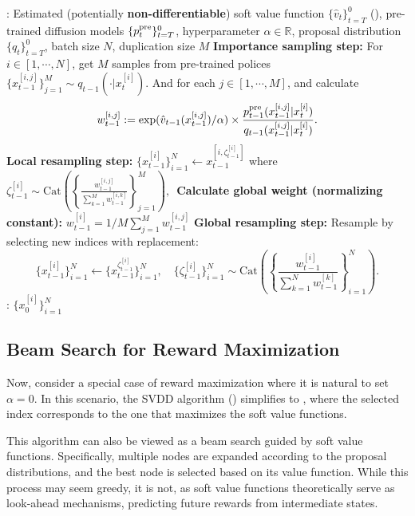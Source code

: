 \begin{algorithm}[!th]
\caption{Nested-IS-Based Guidance}\label{alg:nested_IS}
\begin{algorithmic}[1]
     : Estimated (potentially \textbf{non-differentiable}) soft value function $\{\hat v_t\}_{t=T}^0$ (), pre-trained diffusion models $\{p^{\mathrm{pre}}_t\}_{t=T}^0$, hyperparameter $\alpha \in \mathbb{R}$, proposal distribution $\{q_t\}_{t=T}^0$,  batch size $N$, duplication size $M$
       \STATE \textbf{Importance sampling step:}  For $i \in [1,\cdots,N]$, get $M$ samples from pre-trained polices $\{x^{[i,j]}_{t-1}\}_{j=1}^{M} \sim q_{t-1}(\cdot| x^{[i]}_{t}) $. And for each $j\in [1,\cdots,M]$, and calculate  $$  w^{[i,j]}_{t-1}:=  \exp(\hat v_{t-1}(x^{[i,j]}_{t-1})/\alpha)\times \frac{p^{\mathrm{pre}}_{t-1}(x^{[i,j]}_{t-1}| x^{[i]}_{t}) }{q_{t-1}(x^{[i,j]}_{t-1}| x^{[i]}_{t})}.$$ \label{line:select3}
        \STATE \textbf{Local resampling step:} $ \{ x^{[i]}_{t-1} \}_{i=1}^N   \leftarrow  x^{[i, \zeta^{[i]}_{t-1} ]}_{t-1} $ where $ \zeta^{[i]}_{t-1}  \sim \mathrm{Cat}\left ( \left \{\frac{w^{[i,j]}_{t-1}}{\sum_{k=1}^{M} w^{[i,k ]}_{t-1} } \right \}_{j=1}^{M} \right),\,$ \label{line:select4}
    \STATE \textbf{Calculate global weight (normalizing constant):}  
$ w^{[i]}_{t-1}=1/M \sum_{j=1}^M  w^{[i,j]}_{t-1}$
    \STATE \textbf{Global resampling step:} Resample by selecting new indices with replacement:  \\ 
       $$\{x^{[i]}_{t-1}\}_{i=1}^N  \leftarrow \{x^{\zeta^{[i]}_{t-1}}_{t-1}\}_{i=1}^N,\quad \{\zeta^{[i]}_{t-1}\}_{i=1}^N \sim \mathrm{Cat}\left ( \left \{\frac{w^{[i]}_{t-1}}{\sum_{k=1}^N w^{[k]}_{t-1} } \right \}_{i=1}^N\right).$$
     \ENDFOR
  : $\{ x^{[i]}_0\}_{i=1}^N$
\end{algorithmic}
\end{algorithm}


\subsection{Beam Search for Reward Maximization}\label{sec:beam}


Now, consider a special case of reward maximization where it is natural to set $\alpha = 0$. In this scenario, the SVDD algorithm () simplifies to , where the selected index corresponds to the one that maximizes the soft value functions.

This algorithm can also be viewed as a beam search guided by soft value functions. Specifically, multiple nodes are expanded according to the proposal distributions, and the best node is selected based on its value function. While this process may seem greedy, it is not, as soft value functions theoretically serve as look-ahead mechanisms, predicting future rewards from intermediate states.

